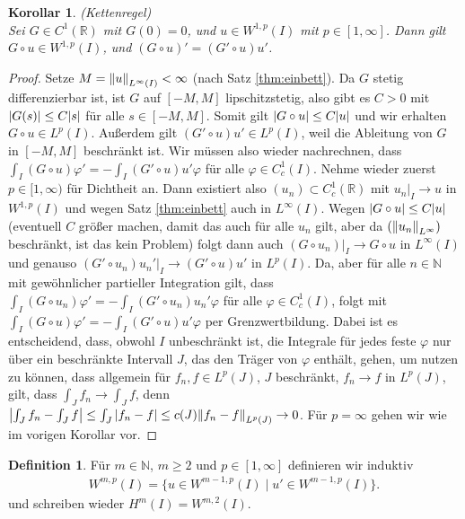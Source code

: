 \documentclass[twoside]{article}
\newtheorem{corollary}[theorem]{Korollar}
\theoremstyle{definition}
\newtheorem{definition}[theorem]{Definition}
\begin{document}
\begin{corollary}(Kettenregel)\\
Sei $G \in C^1(\mathbb{R})$ mit $G(0)=0$, und $u \in W^{1,p}(I)$ mit $p \in [1,\infty]$. Dann gilt $G \circ u \in W^{1,p}(I)$, und $(G \circ u)'=(G' \circ u)u'$.
\end{corollary}
\begin{proof}
Setze $M = \norm{u}_{L^\infty(I)} < \infty$ (nach Satz \ref{thm:einbett}). Da $G$ stetig differenzierbar ist, ist $G$ auf $[-M,M]$ lipschitzstetig, also gibt es $C > 0$ mit $\abs{G(s)} \leq C \abs{s}$ für alle $s \in [-M,M]$. Somit gilt $\abs{G \circ u} \leq C \abs{u}$ und wir erhalten $G \circ u \in L^p(I)$. Außerdem gilt $(G' \circ u) u' \in L^p(I)$, weil die Ableitung von $G$ in $[-M,M]$ beschränkt ist. Wir müssen also wieder nachrechnen, dass $\int_I (G \circ u) \varphi' = - \int_I (G' \circ u) u' \varphi$ für alle $\varphi \in C_c^1(I)$. Nehme wieder zuerst $p \in [1,\infty)$ für Dichtheit an. Dann existiert also $(u_n) \subset C_c^1(\mathbb{R})$ mit $u_n|_I \to u$ in $W^{1,p}(I)$ und wegen Satz \ref{thm:einbett} auch in $L^\infty(I)$. Wegen $\abs{G \circ u} \leq C \abs{u}$ (eventuell $C$ größer machen, damit das auch für alle $u_n$ gilt, aber da $(\norm{u_n}_{L^\infty})$ beschränkt, ist das kein Problem) folgt dann auch $(G \circ u_n)|_I \to G \circ u$ in $L^\infty(I)$ und genauso $(G' \circ u_n)u_n' |_I \to(G' \circ u)u'$ in $L^p(I)$. Da, aber für alle $n \in \mathbb{N}$ mit gewöhnlicher partieller Integration gilt, dass $\int_I (G \circ u_n) \varphi' = - \int_I (G' \circ u_n) u_n' \varphi$ für alle $\varphi \in C_c^1(I)$, folgt mit $\int_I (G \circ u) \varphi' = - \int_I (G' \circ u) u' \varphi$ per Grenzwertbildung. Dabei ist es entscheidend, dass, obwohl $I$ unbeschränkt ist, die Integrale für jedes feste $\varphi$ nur über ein beschränkte Intervall $J$, das den Träger von $\varphi$ enthält, gehen, um nutzen zu können, dass allgemein für $f_n,f \in L^p(J)$, $J$ beschränkt, $f_n \to f$ in $L^p(J)$, gilt, dass $\int_J f_n \to \int_J f$, denn $\abs{\int_J f_n - \int_J f}\leq \int_J \abs{f_n-f} \leq c(J) \norm{f_n-f}_{L^p(J)} \to 0$. Für $p = \infty$ gehen wir wie im vorigen Korollar vor.
\end{proof}
\begin{definition}
Für $m \in \mathbb{N}$, $m \geq 2$ und $p \in [1,\infty]$ definieren wir induktiv
\begin{align*}
W^{m,p}(I) = \{u \in W^{m-1,p}(I)\; | \; u' \in W^{m-1,p}(I)\}.
\end{align*}
und schreiben wieder $H^m(I) = W^{m,2}(I)$.
\end{definition}
\end{document}
